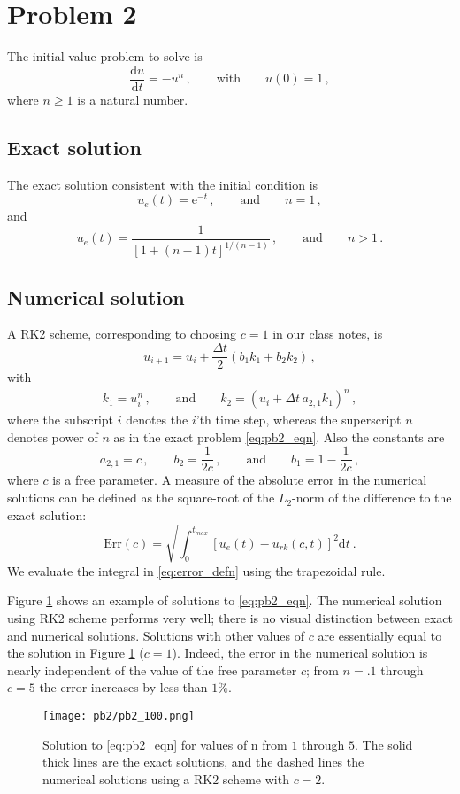 \documentclass[11pt]{article}
\newcommand{\dd}{\mathrm{d}}
\newcommand{\ee}{\mathrm{e}}
\newcommand{\dt}{\Delta t}
\newcommand{\com}{\, ,}
\newcommand{\per}{\, .}
\newcommand{\qqand}{\qquad \text{and} \qquad}
\def\beq{\begin{equation}}
\def\eeq{\end{equation}}
\begin{document}
\section*{Problem 2}
The initial value problem to solve is
\beq
\label{eq:pb2_eqn}
\frac{\dd u}{\dd t} = - u^n\com \qquad \text{with} \qquad u(0) =1\com
\eeq
where $n\ge1$ is a natural number.

\subsection*{Exact solution}
The exact solution consistent with the initial condition is
\beq
u_{e}(t) = \ee^{-t}\com\qqand n=1\com
\eeq
and
\beq
u_e(t) = \frac{1}{[1 +(n-1)t]^{1/(n-1)}}\com\qqand n>1 \per
\eeq

\subsection*{Numerical solution}
A RK2 scheme, corresponding to choosing $c=1$ in our class notes, is
\beq
\label{eq:rk2}
u_{i+1} = u_i + \frac{\dt}{2} \left(b_1 k_1 + b_2 k_2\right)\com
\eeq
with
\begin{align}
    k_1 =  u_i^n \com\qqand k_2 =  (u_i + \dt\, a_{2,1} k_1)^n\com
\end{align}
where the subscript $i$ denotes the $i$'th time step, whereas the superscript $n$ denotes power of $n$ as in the exact problem \eqref{eq:pb2_eqn}. Also the constants are
\beq
\label{eq:param_rk2}
a_{2,1} = c\com \qquad b_2 = \frac{1}{2c}\com \qqand b_1 = 1 - \frac{1}{2c}\com
\eeq
where $c$ is a free parameter. A measure of the absolute error in the numerical solutions can be defined as the square-root of the $L_2$-norm of the difference to the exact solution:
\beq
\label{eq:error_defn}
\text{Err}(c) = \sqrt{\int_0^{t_{max}}\!\!\! [u_e(t)-u_{rk}(c,t)]^2\dd t}\per
\eeq
We evaluate the integral in \eqref{eq:error_defn} using the trapezoidal rule.

Figure \ref{fig:pb2_1} shows an example of solutions to \eqref{eq:pb2_eqn}. The numerical solution using RK2 scheme performs very well; there is no visual distinction between exact and numerical solutions. Solutions with other values of $c$ are essentially equal to the solution in Figure \ref{fig:pb2_1} ($c=1$). Indeed, the error in the numerical solution is nearly independent of the value of the free parameter $c$; from $n=.1$ through $c=5$ the error increases by less than $1\%$.

\begin{figure}[ht]
\begin{center}
\texttt{[image: pb2/pb2\_100.png]}
\end{center}
\caption{Solution to \eqref{eq:pb2_eqn}  for values of n from $1$ through $5$. The solid thick lines are the exact solutions, and the dashed lines the numerical solutions using a RK2 scheme with $c=2$.}
\label{fig:pb2_1}
\end{figure}
\end{document}
